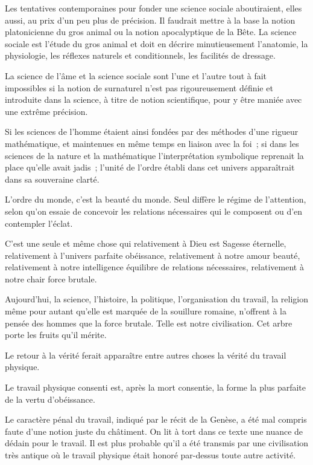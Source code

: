 \documentclass[french,twoside]{book} %
\begin{document}
Les tentatives contemporaines pour fonder une science sociale aboutiraient, elles aussi, au prix d'un peu plus de précision. Il faudrait mettre à la base la notion platonicienne du gros animal ou la notion apocalyptique de la Bête. La science sociale est l'étude du gros animal et doit en décrire minutieusement l'anatomie, la physiologie, les réflexes naturels et conditionnels, les facilités de dressage.\par
La science de l'âme et la science sociale sont l'une et l'autre tout à fait impossibles si la notion de surnaturel n'est pas rigoureusement définie et introduite dans la science, à titre de notion scientifique, pour y être maniée avec une extrême précision.\par
Si les sciences de l'homme étaient ainsi fondées par des méthodes d'une rigueur mathématique, et maintenues en même temps en liaison avec la foi ; si dans les sciences de la nature et la mathématique l'interprétation symbolique reprenait la place qu'elle avait jadis ; l'unité de l'ordre établi dans cet univers apparaîtrait dans sa souveraine clarté.\par
L'ordre du monde, c'est la beauté du monde. Seul diffère le régime de l'attention, selon qu'on essaie de concevoir les relations nécessaires qui le composent ou d'en contempler l'éclat.\par
C'est une seule et même chose qui relativement à Dieu est Sagesse éternelle, relativement à l'univers parfaite obéissance, relativement à notre amour beauté, relativement à notre intelligence équilibre de relations nécessaires, relativement à notre chair force brutale.\par
\par
Aujourd'hui, la science, l'histoire, la politique, l'organisation du travail, la religion même pour autant qu'elle est marquée de la souillure romaine, n'offrent à la pensée des hommes que la force brutale. Telle est notre civilisation. Cet arbre porte les fruits qu'il mérite.\par
Le retour à la vérité ferait apparaître entre autres choses la vérité du travail physique.\par
Le travail physique consenti est, après la mort consentie, la forme la plus parfaite de la vertu d'obéissance.\par
Le caractère pénal du travail, indiqué par le récit de la Genèse, a été mal compris faute d'une notion juste du châtiment. On lit à tort dans ce texte une nuance de dédain pour le travail. Il est plus probable qu'il a été transmis par une civilisation très antique où le travail physique était honoré par-dessus toute autre activité.\par
\end{document}
